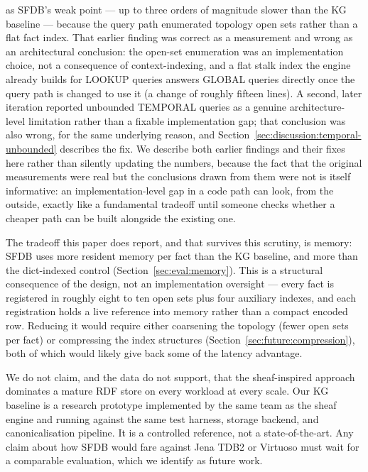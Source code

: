 as SFDB's weak point --- up to three orders of magnitude slower than the KG
baseline --- because the query path enumerated topology open sets rather
than a flat fact index. That earlier finding was correct as a measurement
and wrong as an architectural conclusion: the open-set enumeration was an
implementation choice, not a consequence of context-indexing, and a flat
stalk index the engine already builds for LOOKUP queries answers GLOBAL
queries directly once the query path is changed to use it (a change of
roughly fifteen lines). A second, later iteration reported unbounded
TEMPORAL queries as a genuine architecture-level limitation rather than a
fixable implementation gap; that conclusion was also wrong, for the same
underlying reason, and Section~\ref{sec:discussion:temporal-unbounded}
describes the fix. We describe both earlier findings and their fixes here
rather than silently updating the numbers, because the fact that the
original measurements were real but the conclusions drawn from them were
not is itself informative: an implementation-level gap in a code path can
look, from the outside, exactly like a fundamental tradeoff until someone
checks whether a cheaper path can be built alongside the existing one.

The tradeoff this paper does report, and that survives this scrutiny, is
memory: SFDB uses \rangememkg{} more resident memory per fact than the
KG baseline, and \rangememkgmem{} more than the dict-indexed control
(Section~\ref{sec:eval:memory}). This is a structural
consequence of the design, not an implementation oversight --- every fact
is registered in roughly eight to ten open sets plus four auxiliary
indexes, and each registration holds a live reference into memory rather
than a compact encoded row. Reducing it would require either coarsening
the topology (fewer open sets per fact) or compressing the index
structures (Section~\ref{sec:future:compression}), both of which would
likely give back some of the latency advantage.

We do not claim, and the data do not support, that the sheaf-inspired
approach dominates a mature RDF store on every workload at every scale. Our
KG baseline is a research prototype implemented by the same team as the
sheaf engine and running against the same test harness, storage backend,
and canonicalisation pipeline. It is a controlled reference, not a
state-of-the-art. Any claim about how SFDB would fare against Jena TDB2 or
Virtuoso must wait for a comparable evaluation, which we identify as future
work.

